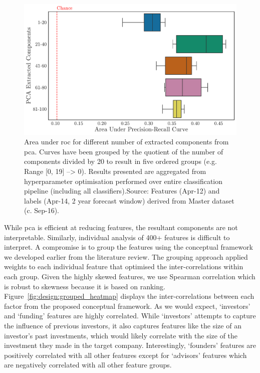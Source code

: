 \documentclass[../thesis/thesis.tex]{subfiles}
\begin{document}
\begin{figure}[!htb]
    \centering
    \includegraphics[width=\textwidth]{../figures/design/extracter}
    \caption[Area under PR Curves by PCA techniques]{Area under \gls{roc} for different number of extracted components from \gls{pca}. Curves have been grouped by the quotient of the number of components divided by 20 to result in five ordered groups (e.g. Range [0, 19] --> 0). Results presented are aggregated from hyperparameter optimisation performed over entire classification pipeline (including all classifiers).Source: Features (Apr-12) and labels (Apr-14, 2 year forecast window) derived from Master dataset (c. Sep-16).}
    \label{fig:design:extracter}
\end{figure}

While \gls{pca} is efficient at reducing features, the resultant components are not interpretable. Similarly, individual analysis of 400+ features is difficult to interpret. A compromise is to group the features using the conceptual framework we developed earlier from the literature review. The grouping approach applied weights to each individual feature that optimised the inter-correlations within each group. Given the highly skewed features, we use Spearman correlation which is robust to skewness because it is based on ranking. Figure~\ref{fig:design:grouped_heatmap} displays the inter-correlations between each factor from the proposed conceptual framework. As we would expect, `investors' and `funding' features are highly correlated. While `investors' attempts to capture the influence of previous investors, it also captures features like the size of an investor's past investments, which would likely correlate with the size of the investment they made in the target company. Interestingly, `founders' features are positively correlated with all other features except for `advisors' features which are negatively correlated with all other feature groups.
\end{document}
